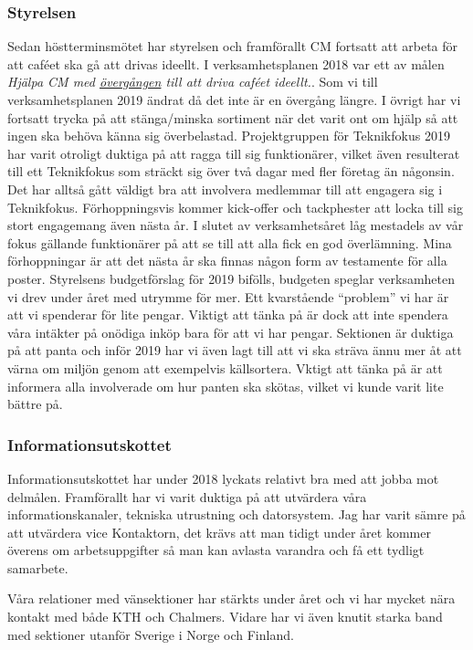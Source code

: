 \documentclass[../_main/handlingar.tex]{subfiles}
\begin{document}

\subsubsection*{Styrelsen}
Sedan höstterminsmötet har styrelsen och framförallt CM fortsatt att arbeta för att caféet ska gå att drivas ideellt. I verksamhetsplanen 2018 var ett av målen \textit{Hjälpa CM med \underline{övergången} till att driva caféet ideellt.}. Som vi till verksamhetsplanen 2019 ändrat då det inte är en övergång längre. I övrigt har vi fortsatt trycka på att stänga/minska sortiment när det varit ont om hjälp så att ingen ska behöva känna sig överbelastad.
Projektgruppen för Teknikfokus 2019 har varit otroligt duktiga på att ragga till sig funktionärer, vilket även resulterat till ett Teknikfokus som sträckt sig över två dagar med fler företag än någonsin. Det har alltså gått väldigt bra att involvera medlemmar till att engagera sig i Teknikfokus. Förhoppningsvis kommer kick-offer och tackphester att locka till sig stort engagemang även nästa år.
I slutet av verksamhetsåret låg mestadels av vår fokus gällande funktionärer på att se till att alla fick en god överlämning. Mina förhoppningar är att det nästa år ska finnas någon form av testamente för alla poster.
Styrelsens budgetförslag för 2019 bifölls, budgeten speglar verksamheten vi drev under året med utrymme för mer. Ett kvarstående ``problem'' vi har är att vi spenderar för lite pengar. Viktigt att tänka på är dock att inte spendera våra intäkter på onödiga inköp bara för att vi har pengar.
Sektionen är duktiga på att panta och inför 2019 har vi även lagt till att vi ska sträva ännu mer åt att värna om miljön genom att exempelvis källsortera. Vktigt att tänka på är att informera alla involverade om hur panten ska skötas, vilket vi kunde varit lite bättre på.  

\subsubsection*{Informationsutskottet}
Informationsutskottet har under 2018 lyckats relativt bra med att jobba mot delmålen. Framförallt har vi varit duktiga på att utvärdera våra informationskanaler, tekniska utrustning och datorsystem. Jag har varit sämre på att utvärdera vice Kontaktorn, det krävs att man tidigt under året kommer överens om arbetsuppgifter så man kan avlasta varandra och få ett tydligt samarbete. 

Våra relationer med vänsektioner har stärkts under året och vi har mycket nära kontakt med både KTH och Chalmers. Vidare har vi även knutit starka band med sektioner utanför Sverige i Norge och Finland.
\end{document}
